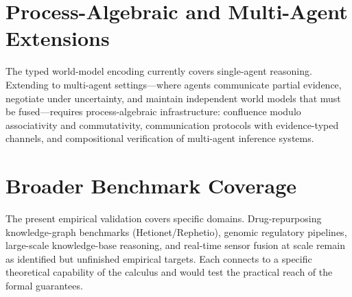 \section{Process-Algebraic and Multi-Agent Extensions}

The typed world-model encoding currently covers single-agent
reasoning.  Extending to multi-agent settings---where agents
communicate partial evidence, negotiate under uncertainty, and
maintain independent world models that must be fused---requires
process-algebraic infrastructure: confluence modulo associativity and
commutativity, communication protocols with evidence-typed channels,
and compositional verification of multi-agent inference systems.

\section{Broader Benchmark Coverage}

The present empirical validation covers specific domains.
Drug-repurposing knowledge-graph benchmarks (Hetionet/Rephetio),
genomic regulatory pipelines, large-scale knowledge-base reasoning,
and real-time sensor fusion at scale remain as identified but
unfinished empirical targets.  Each connects to a specific
theoretical capability of the calculus and would test the practical
reach of the formal guarantees.
